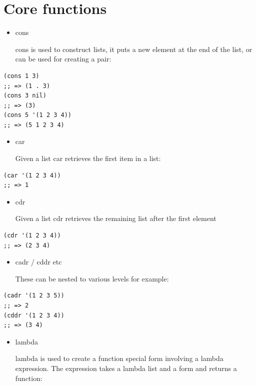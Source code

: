 \documentclass[11pt]{article}
\begin{document}
\section{Core functions}
\label{sec-4}
\begin{itemize}
\item cons

cons is used to construct lists, it puts a new element at the end
of the list, or can be used for creating a pair:
\end{itemize}

\begin{verbatim}
(cons 1 3)
;; => (1 . 3)
(cons 3 nil)
;; => (3)
(cons 5 '(1 2 3 4))
;; => (5 1 2 3 4)
\end{verbatim}

\begin{itemize}
\item car

Given a list car retrieves the first item in a list:
\end{itemize}

\begin{verbatim}
(car '(1 2 3 4))
;; => 1
\end{verbatim}

\begin{itemize}
\item cdr

Given a list cdr retrieves the remaining list after the first
element
\end{itemize}

\begin{verbatim}
(cdr '(1 2 3 4))
;; => (2 3 4)
\end{verbatim}

\begin{itemize}
\item cadr / cddr etc

These can be nested to various levels for example:
\end{itemize}

\begin{verbatim}
(cadr '(1 2 3 5))
;; => 2
(cddr '(1 2 3 4))
;; => (3 4)
\end{verbatim}

\begin{itemize}
\item lambda

lambda is used to create a function special form involving a
lambda expression. The expression takes a lambda list and a form
and returns a function:
\end{itemize}
\end{document}

